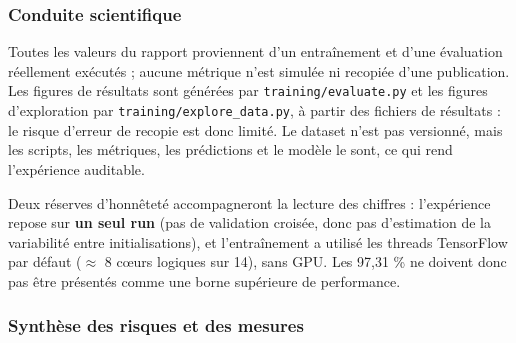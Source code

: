 \documentclass[10pt,a4paper]{article}
\begin{document}
\subsubsection{Conduite scientifique}

Toutes les valeurs du rapport proviennent d'un entraînement et d'une évaluation réellement exécutés ; aucune métrique n'est simulée ni recopiée d'une publication. Les figures de résultats sont générées par \texttt{training/\allowbreak{}evaluate.py} et les figures d'exploration par \texttt{training/\allowbreak{}explore\_\allowbreak{}data.py}, à partir des fichiers de résultats : le risque d'erreur de recopie est donc limité. Le dataset n'est pas versionné, mais les scripts, les métriques, les prédictions et le modèle le sont, ce qui rend l'expérience auditable.

Deux réserves d'honnêteté accompagneront la lecture des chiffres : l'expérience repose sur \textbf{un seul run} (pas de validation croisée, donc pas d'estimation de la variabilité entre initialisations), et l'entraînement a utilisé les threads TensorFlow par défaut ($\approx$ 8 cœurs logiques sur 14), sans GPU. Les 97,31 \% ne doivent donc pas être présentés comme une borne supérieure de performance.

\subsubsection{Synthèse des risques et des mesures}
\end{document}
